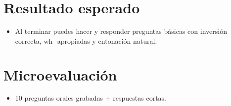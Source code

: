 \section{Resultado esperado}
\begin{itemize}[leftmargin=*]
	\item Al terminar puedes hacer y responder preguntas básicas con inversión correcta, wh- apropiadas y entonación natural.
\end{itemize}

\section{Microevaluación}
\begin{itemize}[leftmargin=*]
	\item 10 preguntas orales grabadas + respuestas cortas.
\end{itemize}
